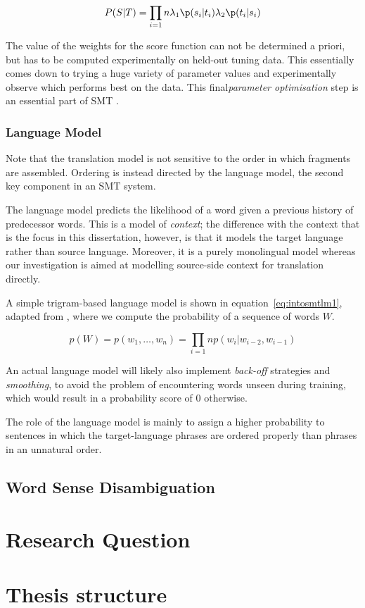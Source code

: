 \begin{equation}
P(S|T) = \prod_{i=1}{n} \lambda_1\p(s_i|t_i)\lambda_2\p(t_i|s_i)
\label{eq:introsmt3}
\end{equation}

The value of the weights for the score function can not be determined a priori,
but has to be computed experimentally on held-out tuning data. This essentially
comes down to trying a huge variety of parameter values and experimentally
observe which performs best on the data.  This final\emph{parameter
optimisation} step is an essential part of SMT \citep{MERT}.

\subsubsection{Language Model}

Note that the translation model is not sensitive to the order in which
fragments are assembled. Ordering is instead directed by the language model,
the second key component in an SMT system.

The language model predicts the likelihood of a word given a previous history
of predecessor words. This is a model of \emph{context}; the difference with
the context that is the focus in this dissertation, however, is that it models
the target language rather than source language. Moreover, it is a purely
monolingual model whereas our investigation is aimed at modelling source-side
context for translation directly.

A simple trigram-based language model is shown in equation~\ref{eq:intosmtlm1}, adapted from
\cite{Cole1997}, where we compute the probability of a sequence of words $W$.

\begin{equation}
p(W) = p(w_1,\ldots,w_n) = \prod_{i=1}{n} p(w_i|w_{i-2},w_{i-1})
\label{eq:introsmtlm1}
\end{equation}

An actual language model will likely also implement \emph{back-off} strategies and
\emph{smoothing}, to avoid the problem of encountering words unseen during
training, which would result in a probability score of $0$ otherwise. 

The role of the language model is mainly to assign a higher probability to
sentences in which the target-language phrases are ordered properly than
phrases in an unnatural order. 


\subsection{Word Sense Disambiguation}


\section{Research Question}


\section{Thesis structure}























